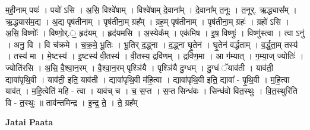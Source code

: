 \documentclass[17pt]{extarticle}
\begin{document}
म॒ही॒नाम् पयः॑ । पयो॑ ऽसि । अ॒सि॒ विश्वे॑षाम् । विश्वे॑षाम् दे॒वाना᳚म् । दे॒वाना᳚म् त॒नूः । त॒नूर्. ऋ॒द्ध्यास᳚म् । ऋ॒द्ध्यास॑म॒द्य । अ॒द्य पृष॑तीनाम् । पृष॑तीना॒म् ग्रह᳚म् । ग्रह॒म् पृष॑तीनाम् । पृष॑तीना॒म् ग्रहः॑ । ग्रहो॑ ऽसि । अ॒सि॒ विष्णोः᳚ । विष्णो॒र्.॒ हृद॑यम् । हृद॑यमसि । अ॒स्येक᳚म् । एक॑मिष । इ॒ष॒ विष्णुः॑ । विष्णु॑स्त्वा । त्वा ऽनु॑ । अनु॒ वि । वि च॑क्रमे । च॒क्र॒मे॒ भू॒तिः । भू॒तिर् द॒द्ध्ना । द॒द्ध्ना घृ॒तेन॑ । घृ॒तेन॑ वर्द्धताम् । व॒र्द्ध॒ता॒म् तस्य॑ । तस्य॑ मा । मे॒ष्टस्य॑ । इ॒ष्टस्य॑ वी॒तस्य॑ । वी॒तस्य॒ द्रवि॑णम् । द्रवि॑ण॒मा । आ ग॑म्यात् । ग॒म्या॒ज् ज्योतिः॑ । ज्योति॑रसि । अ॒सि॒ वै॒श्वा॒न॒रम् । वै॒श्वा॒न॒रम् पृश्ञि॑यै । पृश्ञि॑यै दु॒ग्धम् । दु॒ग्धं ॅयाव॑ती । याव॑ती॒ द्यावा॑पृथि॒वी । याव॑ती॒ इति॒ याव॑ती । द्यावा॑पृथि॒वी म॑हि॒त्वा । द्यावा॑पृथि॒वी इति॒ द्यावा᳚ - पृ॒थि॒वी । म॒हि॒त्वा याव॑त् । म॒हि॒त्वेति॑ महि - त्वा । याव॑च् च । च॒ स॒प्त । स॒प्त सिन्ध॑वः । सिन्ध॑वो वित॒स्थुः । वि॒त॒स्थुरि॑ति वि - त॒स्थुः ॥ ताव॑न्तमिन्द्र । इ॒न्द्र॒ ते॒ । ते॒ ग्रह᳚म् \newline

\textbf{Jatai Paata} \newline
\end{document}
